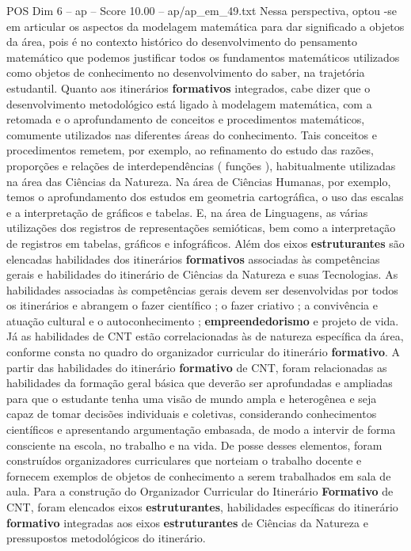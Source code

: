 \begin{textsample}{POS Dim 6 – ap – Score 10.00 – ap/ap\_em\_49.txt}
Nessa perspectiva, optou -se em articular os aspectos da modelagem matemática para dar significado a objetos da área, pois é no contexto histórico do desenvolvimento do pensamento matemático que podemos justificar todos os fundamentos matemáticos utilizados como objetos de conhecimento no desenvolvimento do saber, na trajetória estudantil.
Quanto aos itinerários \textbf{formativos} integrados, cabe dizer que o desenvolvimento metodológico está ligado à modelagem matemática, com a retomada e o aprofundamento de conceitos e procedimentos matemáticos, comumente utilizados nas diferentes áreas do conhecimento.
Tais conceitos e procedimentos remetem, por exemplo, ao refinamento do estudo das razões, proporções e relações de interdependências ( funções ), habitualmente utilizadas na área das Ciências da Natureza.
Na área de Ciências Humanas, por exemplo, temos o aprofundamento dos estudos em geometria cartográfica, o uso das escalas e a interpretação de gráficos e tabelas.
E, na área de Linguagens, as várias utilizações dos registros de representações semióticas, bem como a interpretação de registros em tabelas, gráficos e infográficos.
Além dos eixos \textbf{estruturantes} são elencadas habilidades dos itinerários \textbf{formativos} associadas às competências gerais e habilidades do itinerário de Ciências da Natureza e suas Tecnologias.
As habilidades associadas às competências gerais devem ser desenvolvidas por todos os itinerários e abrangem o fazer científico ; o fazer criativo ; a convivência e atuação cultural e o autoconhecimento ; \textbf{empreendedorismo} e projeto de vida.
Já as habilidades de CNT estão correlacionadas às de natureza específica da área, conforme consta no quadro do organizador curricular do itinerário \textbf{formativo}.
A partir das habilidades do itinerário \textbf{formativo} de CNT, foram relacionadas as habilidades da formação geral básica que deverão ser aprofundadas e ampliadas para que o estudante tenha uma visão de mundo ampla e heterogênea e seja capaz de tomar decisões individuais e coletivas, considerando conhecimentos científicos e apresentando argumentação embasada, de modo a intervir de forma consciente na escola, no trabalho e na vida.
De posse desses elementos, foram construídos organizadores curriculares que norteiam o trabalho docente e fornecem exemplos de objetos de conhecimento a serem trabalhados em sala de aula.
Para a construção do Organizador Curricular do Itinerário \textbf{Formativo} de CNT, foram elencados eixos \textbf{estruturantes}, habilidades específicas do itinerário \textbf{formativo} integradas aos eixos \textbf{estruturantes} de Ciências da Natureza e pressupostos metodológicos do itinerário.

\end{textsample}
